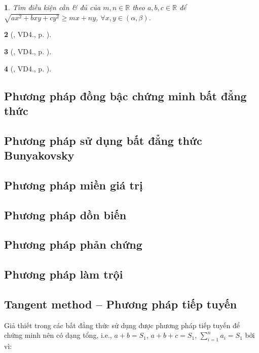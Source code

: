 \documentclass{article}
\newtheorem{baitoan}{}
\begin{document}
\begin{baitoan}
	Tìm điều kiện cần \& đủ của $m,n\in\mathbb{R}$ theo $a,b,c\in\mathbb{R}$ để $\sqrt{ax^2 + bxy + cy^2}\ge mx + ny$, $\forall x,y\in(\alpha,\beta)$.
\end{baitoan}

\begin{baitoan}[\cite{Son_Nghiep_Trung_Can_bdt}, VD4., p. ]
	
\end{baitoan}

\begin{baitoan}[\cite{Son_Nghiep_Trung_Can_bdt}, VD4., p. ]
	
\end{baitoan}

\begin{baitoan}[\cite{Son_Nghiep_Trung_Can_bdt}, VD4., p. ]
	
\end{baitoan}



\subsection{Phương pháp đồng bậc chứng minh bất đẳng thức}

\subsection{Phương pháp sử dụng bất đẳng thức Bunyakovsky}

\subsection{Phương pháp miền giá trị}

\subsection{Phương pháp dồn biến}

\subsection{Phương pháp phản chứng}

\subsection{Phương pháp làm trội}

\subsection{Tangent method -- Phương pháp tiếp tuyến}
Giả thiết trong các bất đẳng thức sử dụng được phương pháp tiếp tuyến để chứng minh nên có dạng tổng, i.e., $a + b = S_1$, $a + b + c = S_1$, $\sum_{i=1}^n a_i = S_1$ bởi vì:
\end{document}
